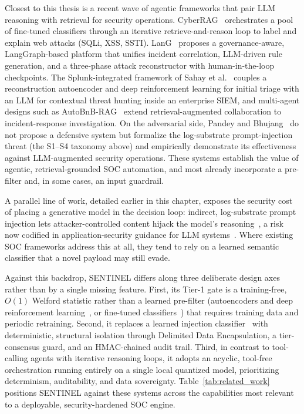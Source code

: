 Closest to this thesis is a recent wave of agentic frameworks that pair LLM reasoning with retrieval for security operations. CyberRAG~\cite{cyberrag2025} orchestrates a pool of fine-tuned classifiers through an iterative retrieve-and-reason loop to label and explain web attacks (SQLi, XSS, SSTI). LanG~\cite{lang2026} proposes a governance-aware, LangGraph-based platform that unifies incident correlation, LLM-driven rule generation, and a three-phase attack reconstructor with human-in-the-loop checkpoints. The Splunk-integrated framework of Sahay et al.~\cite{splunkllm2026} couples a reconstruction autoencoder and deep reinforcement learning for initial triage with an LLM for contextual threat hunting inside an enterprise SIEM, and multi-agent designs such as AutoBnB-RAG~\cite{autobnb2025} extend retrieval-augmented collaboration to incident-response investigation. On the adversarial side, Pandey and Bhujang~\cite{watchtower2026} do not propose a defensive system but formalize the log-substrate prompt-injection threat (the S1--S4 taxonomy above) and empirically demonstrate its effectiveness against LLM-augmented security operations. These systems establish the value of agentic, retrieval-grounded SOC automation, and most already incorporate a pre-filter and, in some cases, an input guardrail.

A parallel line of work, detailed earlier in this chapter, exposes the security cost of placing a generative model in the decision loop: indirect, log-substrate prompt injection lets attacker-controlled content hijack the model's reasoning~\cite{promptinjection2023, watchtower2026}, a risk now codified in application-security guidance for LLM systems~\cite{owasp_llm2025}. Where existing SOC frameworks address this at all, they tend to rely on a learned semantic classifier that a novel payload may still evade.

Against this backdrop, SENTINEL differs along three deliberate design axes rather than by a single missing feature. First, its Tier-1 gate is a training-free, $O(1)$ Welford statistic rather than a learned pre-filter (autoencoders and deep reinforcement learning~\cite{splunkllm2026}, or fine-tuned classifiers~\cite{cyberrag2025}) that requires training data and periodic retraining. Second, it replaces a learned injection classifier~\cite{lang2026} with deterministic, structural isolation through Delimited Data Encapsulation, a tier-consensus guard, and an HMAC-chained audit trail. Third, in contrast to tool-calling agents with iterative reasoning loops, it adopts an acyclic, tool-free orchestration running entirely on a single local quantized model, prioritizing determinism, auditability, and data sovereignty. Table~\ref{tab:related_work} positions SENTINEL against these systems across the capabilities most relevant to a deployable, security-hardened SOC engine.


